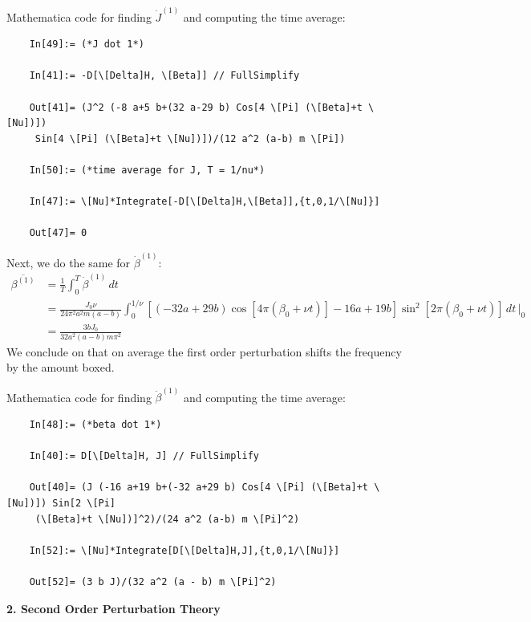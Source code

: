 \documentclass{article}
\theoremstyle{definition}
\newcommand{\be}{\beta}
\newcommand{\f}[2]{\frac{#1}{#2}}
\begin{document}
\begin{enumerate}[label=(\alph*)]
	Mathematica code for finding $\dot J^{(1)}$ and computing the time average:
	\begin{lstlisting}
	In[49]:= (*J dot 1*)
	
	In[41]:= -D[\[Delta]H, \[Beta]] // FullSimplify
	
	Out[41]= (J^2 (-8 a+5 b+(32 a-29 b) Cos[4 \[Pi] (\[Beta]+t \[Nu])])
	 Sin[4 \[Pi] (\[Beta]+t \[Nu])])/(12 a^2 (a-b) m \[Pi])
	
	In[50]:= (*time average for J, T = 1/nu*)
	
	In[47]:= \[Nu]*Integrate[-D[\[Delta]H,\[Beta]],{t,0,1/\[Nu]}]
	
	Out[47]= 0
	\end{lstlisting}
	
	Next, we do the same for $\dot{\be}^{(1)}$:
	\begin{align*}
	\overline{\be^{(1)}}
	&= \f{1}{T} \int^T_0  \dot \be^{(1)}\,dt \\
	&= \frac{J_0 \nu }{24 \pi ^2 a^2 m (a-b)}
	\int_0^{1/\nu} [(-32 a + 29 b) \cos [4 \pi  (\beta_0 +\nu  t)] - 16 a + 19
	b] \sin ^2[2 \pi  (\beta_0 +\nu  t)]  \,dt\,\bigg\vert_0\\
	&= \boxed{\f{3bJ_0 }{32 a^2 (a-b)m \pi^2}}
	\end{align*}
	We conclude on that on average the first order perturbation shifts the frequency by the amount boxed. 
	
	Mathematica code for finding $\dot \be^{(1)}$ and computing the time average:
	\begin{lstlisting}
	In[48]:= (*beta dot 1*)
	
	In[40]:= D[\[Delta]H, J] // FullSimplify
	
	Out[40]= (J (-16 a+19 b+(-32 a+29 b) Cos[4 \[Pi] (\[Beta]+t \[Nu])]) Sin[2 \[Pi]
	 (\[Beta]+t \[Nu])]^2)/(24 a^2 (a-b) m \[Pi]^2)
	
	In[52]:= \[Nu]*Integrate[D[\[Delta]H,J],{t,0,1/\[Nu]}] 
	
	Out[52]= (3 b J)/(32 a^2 (a - b) m \[Pi]^2)
	\end{lstlisting}
\end{enumerate}



\newpage



\noindent \textbf{2. Second Order Perturbation Theory}
\end{document}
